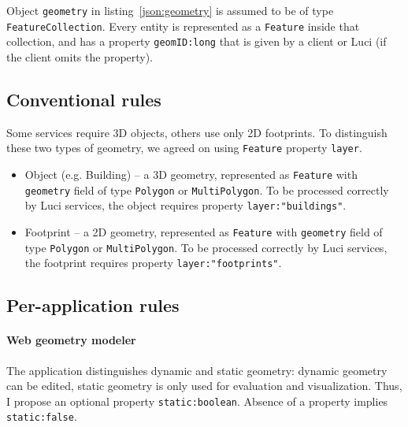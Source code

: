 \documentclass[pdftex,11pt,a4paper]{article} %
\begin{document}
Object \texttt{geometry} in listing~\ref{json:geometry} is assumed to be of type \texttt{FeatureCollection}.
Every entity is represented as a \texttt{Feature} inside that collection, and has a property \texttt{geomID:\color{blue}long} that is given by a client or \ac{Luci} (if the client omits the property).

\subsection{Conventional rules}
\label{sec:convenru}

Some services require 3D objects, others use only 2D footprints.
To distinguish these two types of geometry, we agreed on using \texttt{Feature} property \texttt{layer}.
\begin{itemize}
\item Object (e.g. Building) -- a 3D geometry, represented as \texttt{Feature} with \texttt{geometry} field of type \texttt{Polygon} or \texttt{MultiPolygon}.
To be processed correctly by \ac{Luci} services, the object requires property \texttt{layer:\color{red}"buildings"}.
%
\item Footprint -- a 2D geometry, represented as \texttt{Feature} with \texttt{geometry}
field of type \texttt{Polygon} or \texttt{MultiPolygon}.
To be processed correctly by \ac{Luci} services, the footprint requires property \texttt{layer:\color{red}"footprints"}.
\end{itemize}


\subsection{Per-application rules}
\label{sec:appru}


\paragraph{Web geometry modeler}
The application distinguishes dynamic and static geometry:
dynamic geometry can be edited, static geometry is only used for evaluation and visualization.
Thus, I propose an optional property \texttt{static:\color{blue}boolean}.
Absence of a property implies \texttt{static:\color{brown}false}.

\end{document}
